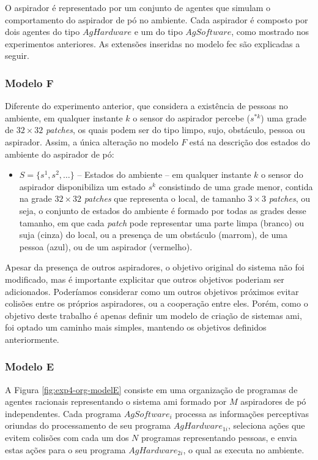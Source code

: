 O aspirador é representado por um conjunto de agentes que simulam o comportamento do aspirador de pó no ambiente. Cada aspirador é composto por dois agentes do tipo $AgHardware$ e um do tipo $AgSoftware$, como mostrado nos experimentos anteriores. As extensões inseridas no modelo \acrshort{fec} são explicadas a seguir.

\subsubsection{Modelo F}

Diferente do experimento anterior, que considera a existência de pessoas no ambiente, em qualquer instante $k$ o sensor do aspirador percebe ($s^{*k}$) uma grade de $32 \times 32$ \textit{patches}, os quais podem ser do tipo limpo, sujo, obstáculo, pessoa ou aspirador. Assim, a única alteração no modelo $F$ está na descrição dos estados do ambiente do aspirador de pó: 

\begin{itemize}
    \item $S = \{s^1, s^2, \ldots\}$ -- Estados do ambiente – em qualquer instante $k$ o sensor do aspirador disponibiliza um estado $s^k$ consistindo de uma grade menor, contida na grade $32 \times 32$ \textit{patches} que representa o local, de tamanho $3 \times 3$ \textit{patches}, ou seja, o conjunto de estados do ambiente é formado por todas as grades desse tamanho, em que cada \textit{patch} pode representar uma parte limpa (branco) ou suja (cinza) do local, ou a presença de um obstáculo (marrom), de uma pessoa (azul), ou de um aspirador (vermelho).
\end{itemize}

Apesar da presença de outros aspiradores, o objetivo original do sistema não foi modificado, mas é importante explicitar que outros objetivos poderiam ser adicionados. Poderíamos considerar como um outros objetivos próximos evitar colisões entre os próprios aspiradores, ou a cooperação entre eles. Porém, como o objetivo deste trabalho é apenas definir um modelo de criação de sistemas \acrshort{ami}, foi optado um caminho mais simples, mantendo os objetivos definidos anteriormente. 

\subsubsection{Modelo E}

A Figura \ref{fig:exp4-org-modelE} consiste em uma organização de programas de agentes racionais representando o sistema \acrshort{ami} formado por $M$ aspiradores de pó independentes. Cada programa $AgSoftware_i$ processa as informações perceptivas oriundas do processamento de seu programa $AgHardware_{1i}$, seleciona ações que evitem colisões com cada um dos $N$ programas representando pessoas, e envia estas ações para o seu programa $AgHardware_{2i}$, o qual as executa no ambiente.

